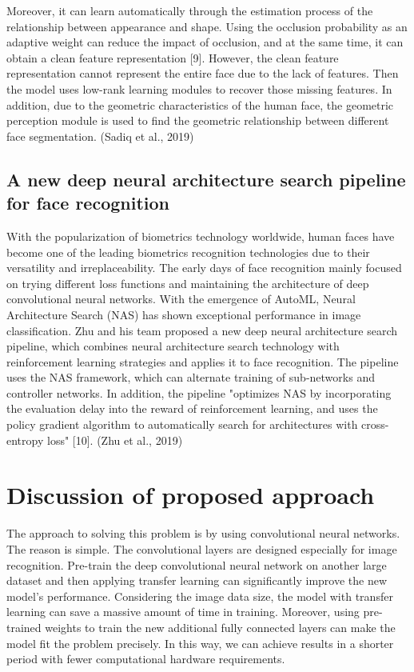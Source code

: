 \documentclass{article}
\begin{document}
Moreover, it can learn automatically through the estimation process of the relationship between appearance and shape. Using the occlusion probability as an adaptive weight can reduce the impact of occlusion, and at the same time, it can obtain a clean feature representation [9]. However, the clean feature representation cannot represent the entire face due to the lack of features. Then the model uses low-rank learning modules to recover those missing features. In addition, due to the geometric characteristics of the human face, the geometric perception module is used to find the geometric relationship between different face segmentation. (Sadiq et al., 2019)

\subsection{A new deep neural architecture search pipeline for face recognition}
With the popularization of biometrics technology worldwide, human faces have become one of the leading biometrics recognition technologies due to their versatility and irreplaceability. The early days of face recognition mainly focused on trying different loss functions and maintaining the architecture of deep convolutional neural networks. With the emergence of AutoML, Neural Architecture Search (NAS) has shown exceptional performance in image classification. Zhu and his team proposed a new deep neural architecture search pipeline, which combines neural architecture search technology with reinforcement learning strategies and applies it to face recognition. The pipeline uses the NAS framework, which can alternate training of sub-networks and controller networks. In addition, the pipeline "optimizes NAS by incorporating the evaluation delay into the reward of reinforcement learning, and uses the policy gradient algorithm to automatically search for architectures with cross-entropy loss" [10]. (Zhu et al., 2019)


\section{Discussion of proposed approach}
\label{approach}
The approach to solving this problem is by using convolutional neural networks. The reason is simple. The convolutional layers are designed especially for image recognition. Pre-train the deep convolutional neural network on another large dataset and then applying transfer learning can significantly improve the new model's performance. Considering the image data size, the model with transfer learning can save a massive amount of time in training.  Moreover, using pre-trained weights to train the new additional fully connected layers can make the model fit the problem precisely. In this way, we can achieve results in a shorter period with fewer computational hardware requirements.
\end{document}
